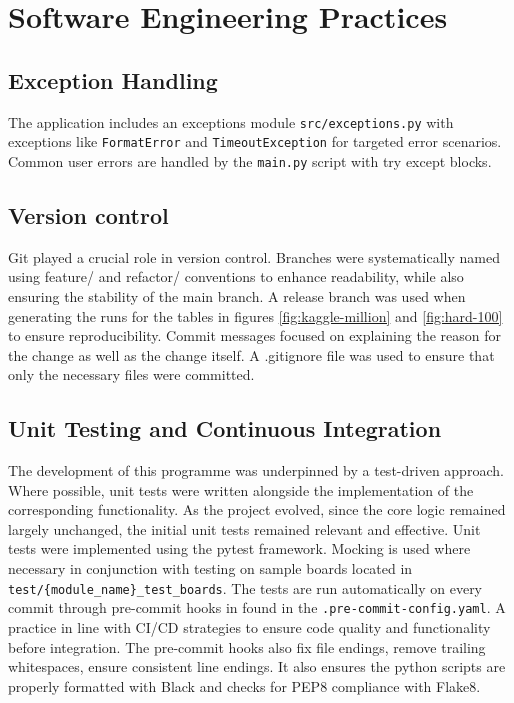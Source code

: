 \documentclass[11pt]{article}
\begin{document}
\section{Software Engineering Practices}

\subsection{Exception Handling}
The application includes an exceptions module \texttt{src/exceptions.py} with exceptions like \texttt{FormatError} and \texttt{TimeoutException} for targeted error scenarios. Common user errors are handled by the \texttt{main.py} script with try except blocks.
\subsection{Version control}
Git played a crucial role in version control. Branches were systematically named using feature/ and refactor/ conventions to enhance readability, while also ensuring the stability of the main branch. A release branch was used when generating the runs for the tables in figures \ref{fig:kaggle-million} and \ref{fig:hard-100} to ensure reproducibility. Commit messages focused on explaining the reason for the change as well as the change itself. A .gitignore file was used to ensure that only the necessary files were committed. 

\subsection{Unit Testing and Continuous Integration}
The development of this programme was underpinned by a test-driven approach. Where possible, unit tests were written alongside the implementation of the corresponding functionality. As the project evolved, since the core logic remained largely unchanged, the initial unit tests remained relevant and effective. Unit tests were implemented using the pytest framework. Mocking is used where necessary in conjunction with testing on sample boards located in \texttt{test/\{module\_name\}\_test\_boards}. 
The tests are run automatically on every commit through pre-commit hooks in found in the \texttt{.pre-commit-config.yaml}. A practice in line with CI/CD strategies to ensure code quality and functionality before integration. The pre-commit hooks also fix file endings, remove trailing whitespaces, ensure consistent line endings. It also ensures the python scripts are properly formatted with Black and checks for PEP8 compliance with Flake8.
\end{document}
